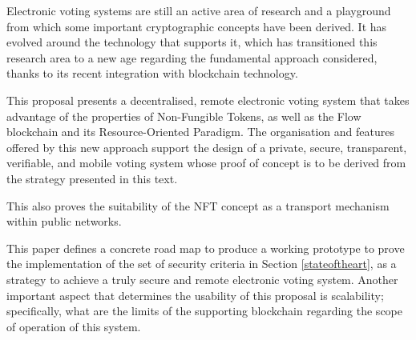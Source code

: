 \documentclass[../main.tex]{subfiles}
\begin{document}
Electronic voting systems are still an active area of research and a playground from which some important cryptographic concepts have been derived. It has evolved around the technology that supports it, which has transitioned this research area to a new age regarding the fundamental approach considered, thanks to its recent integration with blockchain technology.
\par
This proposal presents a decentralised, remote electronic voting system that takes advantage of the properties of Non-Fungible Tokens, as well as the Flow blockchain and its Resource-Oriented Paradigm. The organisation and features offered by this new approach support the design of a private, secure, transparent, verifiable, and mobile voting system whose proof of concept is to be derived from the strategy presented in this text.
\par
This also proves the suitability of the NFT concept as a transport mechanism within public networks.
\par
This paper defines a concrete road map to produce a working prototype to prove the implementation of the set of security criteria in Section \ref{stateoftheart}, as a strategy to achieve a truly secure and remote electronic voting system. Another important aspect that determines the usability of this proposal is scalability; specifically, what are the limits of the supporting blockchain regarding the scope of operation of this system.
\end{document}

